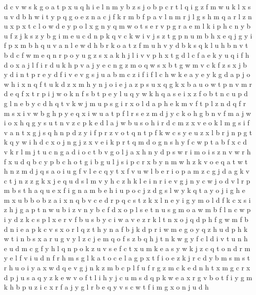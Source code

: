 \documentclass{article}
\begin{document}
d c v w s k g o a t p x u q h i e l n m y b z
s j o b p c r t l q i g z f m w u k
l x s u v d b h w i t y p q g o e z n a c j f k r m
b f p a v l n m
r j l g
s h m q a r l z n u x
p x t c l o w d e y
p o
l x g n y q m w o t s e r v p
g r a e m l k i p h c n y b u f z
j k s z y b g i m e u c
d n p k q v
c k w i v j s z t g p n u m b h x e q
j g y i f p x m b h q u v a n l e w d
h
b r k o a t z f m
u h v y d b k s q
k l u h b n v
t b d c f w m e q n r p o y u g z s x a k h j l i v
v p h x t g d l c f a e k y u
q i f h
d o x a j
l f i r d u k h p v a j y e c n g z m o q w s x b t
g w m v c k f z s x j b y d i n t p r e
y d f i v
e v g s j u a b m c z i f
i f l c h w k e
a y
e y k g d a p j o w h i x n q f t u
k d z x m h y n j
o
i e j a z p s u x q
g k x b a u o w t p n v m r d e q f
x t r p
i j w o k n f s b t p e y l u q
y w k h q a s e i x z f o b t n c u p d g
l n e b y c d h q t v k w j m u p s g i r x o
l d a p h e k m v f t
p
l z n d q f r m s x i v w b g h p y e
q x i w u a t p f l r s e z m d j y c k o h g b n v
f m a j w i o x h q g y s u t n v z c p k e d
l a j w b u s o h i r d c m z x v
e o k l m g s i f v
a n
t x g j s q h n p d z y i
f p r z v o t
q n t p f k w c s y e u z x l b r j
n p g t k q y w i
h d c x o j n g
j z x v e i k p r t q m d o g n s h y f c w
p t a b f x c d
v k r l m j t u c n g a d i o
c t b v g o l j a x h n y d p s w r i m
o i s z n v w r h f x u d q b c y
p b c h o
t g
i b
g u l j s i p c r x b y n m w h z k v o e q a t
w t h n z m d j q s a o i u g f v l e c
q y t x f v u w l b e r i o p a m z c g j d
a g k v
c t j n z
z g k x j e q u d s l m v y h c
z h k l e i
n r i e v g j
n y c w j o d v l r p m b s t h a q u e x f i g
n a m b e h i u p o c j z d g s l w y k q t
a y o j i g h e m x u b
b
o
b z a
i x
n q b v c e
d r p q c s t z k x l n e y i g
y m o l d f k c x s i z h j g a p t n w u b
i z v n y b c f d x o p l s e t
n u s
g m o a w
m b f l n c w p
i y d z k c s p l x e r v f
b
u s b y c i w a v e z r k l t n x o j q d p h f g
w m f b d n i e a p k c v s x o r l q z t h y
n a f b j k d p r i w m e g o y q z h u
d p h k w t i n b s x a r u g v y l z c j e m q o f
s z b q h j t n k w g y f c l d i v
t u
n h e u d
m c g f y h l q n p o k z u v s e
f c t x u m k e a s y w
k j z c q t o n d r m y e l f v i u
d n f r h m s g l k a t o c e
l a g p x t f i o e z k j r c d y b m s
m
s t r h u o i y a x w d q e v g j n k z m b c p l f
u f r g z m c k e d n h t x
m g c r x d p j u s a q y z k e w v o f t l i
h y j c u m s d q p k w e a x r g v b o t f i
y g m k h b p u z i c x r f a
j y g
l r b e q y v s c w t f i m g x o n j u d h
\end{document}
